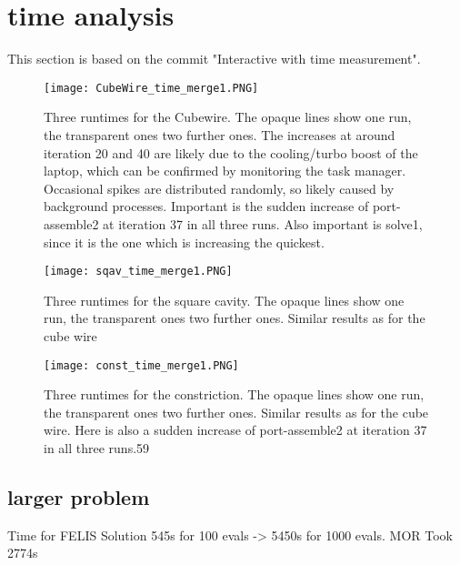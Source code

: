 




\section{time analysis}
This section is based on the commit "Interactive with time measurement".

\begin{figure}[h]
	\centering
	\texttt{[image: CubeWire\_time\_merge1.PNG]}
	\caption{Three runtimes for the Cubewire. The opaque lines show one run, the transparent ones two further ones. The increases at around iteration 20 and 40 are likely due to the cooling/turbo boost of the laptop, which can be confirmed by monitoring the task manager. Occasional spikes are distributed randomly, so likely caused by background processes. Important is the sudden increase of port-assemble2 at iteration 37 in all three runs. Also important is solve1, since it is the one which is increasing the quickest.}
	\label{}
\end{figure}


\begin{figure}[h]
	\centering
	\texttt{[image: sqav\_time\_merge1.PNG]}
	\caption{Three runtimes for the square cavity. The opaque lines show one run, the transparent ones two further ones. Similar results as for the cube wire}
	\label{}
\end{figure}



\begin{figure}[h]
	\centering
	\texttt{[image: const\_time\_merge1.PNG]}
	\caption{Three runtimes for the constriction. The opaque lines show one run, the transparent ones two further ones. Similar results as for the cube wire. Here is also a sudden increase of port-assemble2 at iteration 37 in all three runs.59}
	\label{}
\end{figure}

\subsection{larger problem}
Time for FELIS Solution  545s for 100 evals -> 5450s for 1000 evals. MOR Took 2774s



































